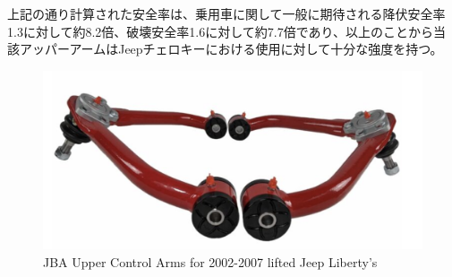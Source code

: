 \documentclass[dvipdfmx]{jsarticle}
\begin{document}
上記の通り計算された安全率は、乗用車に関して一般に期待される降伏安全率1.3に対して約8.2倍、破壊安全率1.6に対して約7.7倍であり、以上のことから当該アッパーアームはJeepチェロキーにおける使用に対して十分な強度を持つ。

\begin{figure}[h]
  \centering
  \includegraphics[scale=0.5]{arm-pic.png}
  \caption{JBA Upper Control Arms for 2002-2007 lifted Jeep Liberty's}
  \label{fig:arm}
\end{figure}
\end{document}
